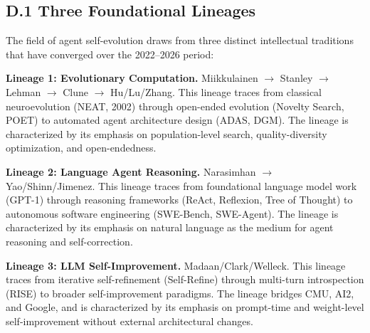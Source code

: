 \subsection*{D.1 Three Foundational Lineages}

The field of agent self-evolution draws from three distinct intellectual traditions that have converged over the 2022--2026 period:

\textbf{Lineage 1: Evolutionary Computation.} Miikkulainen $\to$ Stanley $\to$ Lehman $\to$ Clune $\to$ Hu/Lu/Zhang. This lineage traces from classical neuroevolution (NEAT, 2002) through open-ended evolution (Novelty Search, POET) to automated agent architecture design (ADAS, DGM). The lineage is characterized by its emphasis on population-level search, quality-diversity optimization, and open-endedness.

\textbf{Lineage 2: Language Agent Reasoning.} Narasimhan $\to$ Yao/Shinn/Jimenez. This lineage traces from foundational language model work (GPT-1) through reasoning frameworks (ReAct, Reflexion, Tree of Thought) to autonomous software engineering (SWE-Bench, SWE-Agent). The lineage is characterized by its emphasis on natural language as the medium for agent reasoning and self-correction.

\textbf{Lineage 3: LLM Self-Improvement.} Madaan/Clark/Welleck. This lineage traces from iterative self-refinement (Self-Refine) through multi-turn introspection (RISE) to broader self-improvement paradigms. The lineage bridges CMU, AI2, and Google, and is characterized by its emphasis on prompt-time and weight-level self-improvement without external architectural changes.


